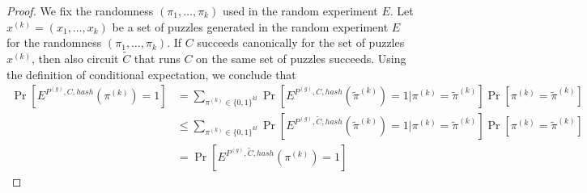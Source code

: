 \begin{proof}
We fix the randomness $(\pi_1, \dots, \pi_k)$ used in the random experiment $E$.
Let $x^{(k)} = (x_1, \dots, x_k)$ be a set of puzzles generated in the random experiment $E$ for the randomness $(\pi_1, \dots, \pi_k)$.
If $C$ succeeds canonically for the set of puzzles $x^{(k)}$, then also circuit $\widetilde{C}$ that runs $C$ on the same set of puzzles succeeds.
Using the definition of conditional expectation, we conclude that
\begin{align*}
  \underset{}{\Pr}[E^{P^{(g)}, C, hash}(\pi^{(k)}) = 1] &=
  \sum_{\pi^{(k)} \in \{0,1\}^{kl}}\underset{}{\Pr}[E^{P^{(g)}, C, hash}(\widetilde{\pi}^{(k)}) = 1 | \pi^{(k)} = \widetilde{\pi}^{(k)}] \underset{}{\Pr}[\pi^{(k)} = \widetilde{\pi}^{(k)}] \\
  &\leq
  \sum_{\pi^{(k)} \in \{0,1\}^{kl}}\underset{}{\Pr}[E^{P^{(g)}, \widetilde{C}, hash}(\widetilde{\pi}^{(k)}) = 1 | \pi^{(k)} = \widetilde{\pi}^{(k)}] \underset{}{\Pr}[\pi^{(k)} = \widetilde{\pi}^{(k)}] \\
  &= \underset{}{\Pr}[E^{P^{(g)}, \widetilde{C}, hash}(\pi^{(k)}) = 1]
\end{align*}

\end{proof}

